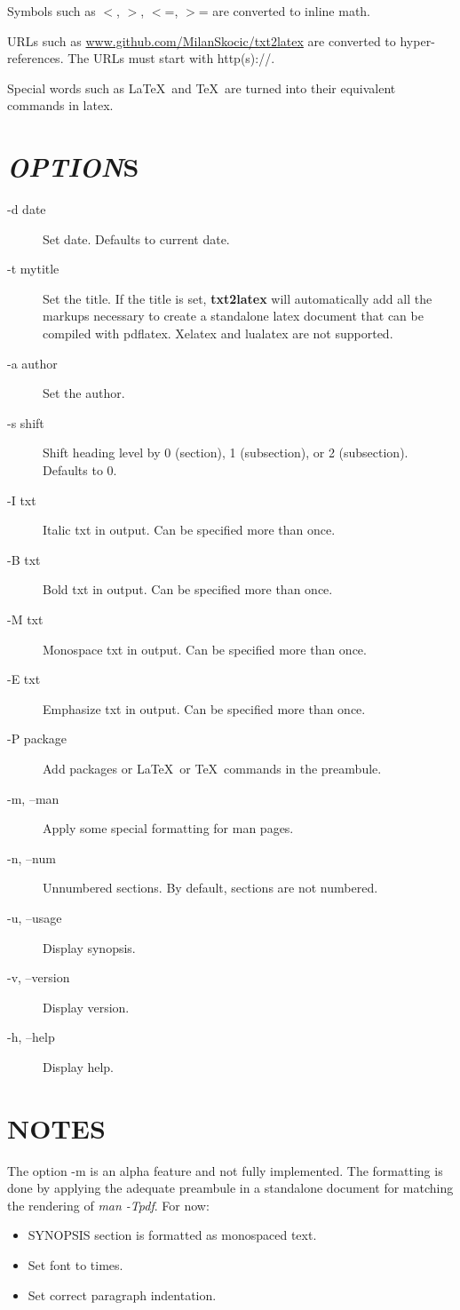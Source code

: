 \documentclass[10pt,notitlepage]{article}
\begin{document}
Symbols such as $<$, $>$, $<$=, $>$= are converted to inline math.

URLs such as \href{https://www.github.com/MilanSkocic/txt2latex}{www.github.com/MilanSkocic/txt2latex}  are converted
to hyper-references. The URLs must start with http(s)://.

Special words such as \LaTeX\   and \TeX\  are turned into their equivalent 
commands in latex.
   
\section*{\textit{OPTION}S}
\begin{description}
\item[-d date] Set date. Defaults to current date.
\item[-t mytitle] Set the title. If the title is set, \textbf{txt2latex} will 
                  automatically add all the markups necessary to 
                  create a standalone latex document that can be compiled 
                  with pdflatex. Xelatex and lualatex are not supported. 
\item[-a author] Set the author.
\item[-s shift] Shift heading level by 0 (section), 1 (subsection), or 2 (subsection).
                Defaults to 0.
\item[-I txt] Italic txt in output. Can be specified more than once.
\item[-B txt] Bold txt in output. Can be specified more than once.
\item[-M txt] Monospace txt in output. Can be specified more than once.
\item[-E txt] Emphasize txt in output. Can be specified more than once.
\item[-P package] Add packages or \LaTeX\   or \TeX\  commands in the preambule.
\item[-m, --man] Apply some special formatting for man pages.
\item[-n, --num] Unnumbered sections. By default, sections are not numbered.
\item[-u, --usage] Display synopsis.
\item[-v, --version] Display version.
\item[-h, --help] Display help.
\end{description}

\section*{NOTES}
The option -m is an alpha feature and not fully implemented. 
The formatting is done by applying the adequate preambule in a 
standalone document for matching the rendering of \emph{man -Tpdf}.
For now:
\begin{itemize}
\item SYNOPSIS section is formatted as monospaced text.
\item Set font to times.
\item Set correct paragraph indentation.
\end{itemize}
\end{document}
